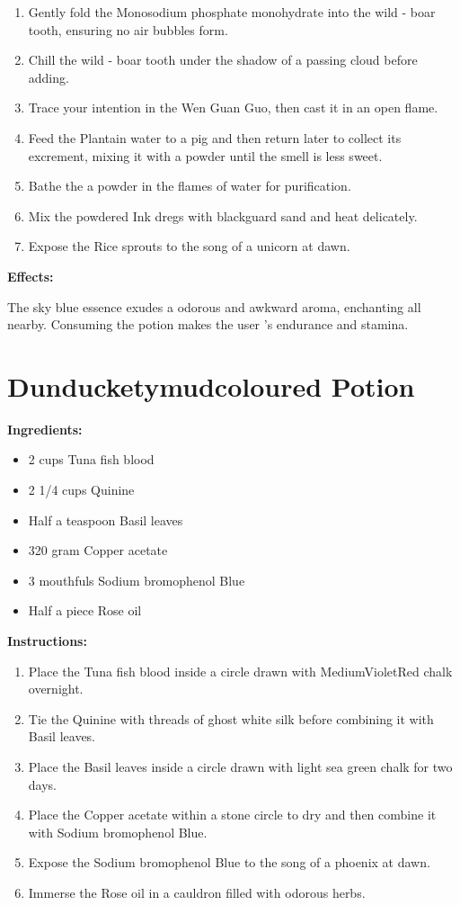 \documentclass{article}
\begin{document}
\begin{enumerate}
  \item Gently fold the Monosodium phosphate monohydrate into the wild - boar tooth, ensuring no air bubbles form.
  \item Chill the wild - boar tooth under the shadow of a passing cloud before adding.
  \item Trace your intention in the Wen Guan Guo, then cast it in an open flame.
  \item Feed the Plantain water to a pig and then return later to collect its excrement, mixing it with a powder until the smell is less sweet.
  \item Bathe the a powder in the flames of water for purification.
  \item Mix the powdered Ink dregs with blackguard sand and heat delicately.
  \item Expose the Rice sprouts to the song of a unicorn at dawn.
\end{enumerate}

\textbf{Effects:}

The sky blue essence exudes a odorous and awkward aroma, enchanting all nearby. Consuming the potion makes the user 's endurance and stamina.

\newpage
\section*{Dunducketymudcoloured Potion}

\textbf{Ingredients:}

\begin{itemize}
  \item 2 cups Tuna fish blood
  \item 2 1/4 cups Quinine
  \item Half a teaspoon Basil leaves
  \item 320 gram Copper acetate
  \item 3 mouthfuls Sodium bromophenol Blue
  \item Half a piece Rose oil
\end{itemize}

\textbf{Instructions:}

\begin{enumerate}
  \item Place the Tuna fish blood inside a circle drawn with MediumVioletRed chalk overnight.
  \item Tie the Quinine with threads of ghost white silk before combining it with Basil leaves.
  \item Place the Basil leaves inside a circle drawn with light sea green chalk for two days.
  \item Place the Copper acetate within a stone circle to dry and then combine it with Sodium bromophenol Blue.
  \item Expose the Sodium bromophenol Blue to the song of a phoenix at dawn.
  \item Immerse the Rose oil in a cauldron filled with odorous herbs.
\end{enumerate}
\end{document}
